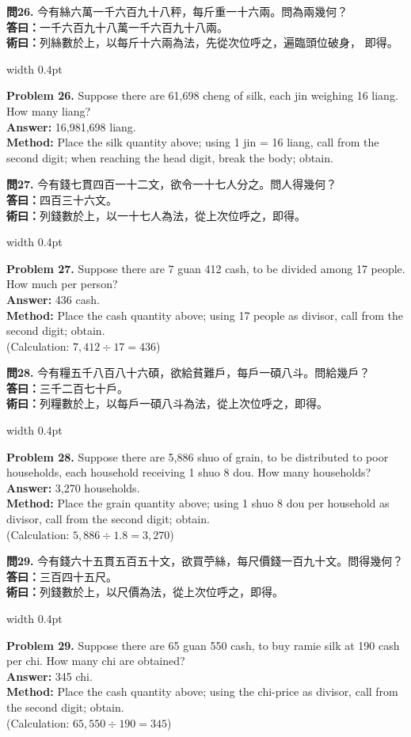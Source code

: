 \documentclass[10pt,a4paper]{article}
\newlength{\cnwidth}
\newlength{\enwidth}
\newcommand{\bilingual}[2]{%
  \noindent%
  \begin{minipage}[t]{\cnwidth}%
    #1%
  \end{minipage}%
  \hfill\vrule width 0.4pt\hfill%
  \begin{minipage}[t]{\enwidth}%
    #2%
  \end{minipage}%
  \par\smallskip%
}
\begin{document}
\bilingual{%
  \textbf{問26.}
  今有絲六萬一千六百九十八秤，每斤重一十六兩。問為兩幾何？\\
  \textbf{答曰：}一千六百九十八萬一千六百九十八兩。\\
  \textbf{術曰：}列絲數於上，以每斤十六兩為法，先從次位呼之，遍臨頭位破身，
  即得。
}{%
  \textbf{Problem 26.}
  Suppose there are 61,698 cheng of silk, each jin weighing 16 liang.
  How many liang?\\
  \textbf{Answer:} 16,981,698 liang.\\
  \textbf{Method:} Place the silk quantity above; using 1 jin = 16 liang,
  call from the second digit; when reaching the head digit, break the body; obtain.
}

\bilingual{%
  \textbf{問27.}
  今有錢七貫四百一十二文，欲令一十七人分之。問人得幾何？\\
  \textbf{答曰：}四百三十六文。\\
  \textbf{術曰：}列錢數於上，以一十七人為法，從上次位呼之，即得。
}{%
  \textbf{Problem 27.}
  Suppose there are 7 guan 412 cash, to be divided among 17 people.
  How much per person?\\
  \textbf{Answer:} 436 cash.\\
  \textbf{Method:} Place the cash quantity above; using 17 people as divisor,
  call from the second digit; obtain.\\
  (Calculation: $7{,}412 \div 17 = 436$)
}

\bilingual{%
  \textbf{問28.}
  今有糧五千八百八十六碩，欲給貧難戶，每戶一碩八斗。問給幾戶？\\
  \textbf{答曰：}三千二百七十戶。\\
  \textbf{術曰：}列糧數於上，以每戶一碩八斗為法，從上次位呼之，即得。
}{%
  \textbf{Problem 28.}
  Suppose there are 5,886 shuo of grain, to be distributed to poor households,
  each household receiving 1 shuo 8 dou. How many households?\\
  \textbf{Answer:} 3,270 households.\\
  \textbf{Method:} Place the grain quantity above; using 1 shuo 8 dou per household
  as divisor, call from the second digit; obtain.\\
  (Calculation: $5{,}886 \div 1.8 = 3{,}270$)
}

\bilingual{%
  \textbf{問29.}
  今有錢六十五貫五百五十文，欲買苧絲，每尺價錢一百九十文。問得幾何？\\
  \textbf{答曰：}三百四十五尺。\\
  \textbf{術曰：}列錢數於上，以尺價為法，從上次位呼之，即得。
}{%
  \textbf{Problem 29.}
  Suppose there are 65 guan 550 cash, to buy ramie silk at 190 cash per chi.
  How many chi are obtained?\\
  \textbf{Answer:} 345 chi.\\
  \textbf{Method:} Place the cash quantity above; using the chi-price as divisor,
  call from the second digit; obtain.\\
  (Calculation: $65{,}550 \div 190 = 345$)
}
\end{document}
